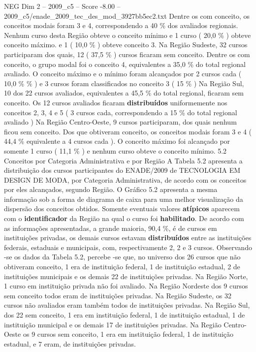 \begin{textsample}{NEG Dim 2 – 2009\_c5 – Score -8.00 – 2009\_c5/enade\_2009\_tec\_des\_mod\_3927bb5ec2.txt}
Dentre os com conceito, os conceitos modais foram 3 e 4, correspondendo a 40 \% dos avaliados regionais.
Nenhum curso desta Região obteve o conceito mínimo e 1 curso ( 20,0 \% ) obteve conceito máximo. e 1 ( 10,0 \% ) obteve conceito 3.
Na Região Sudeste, 32 cursos participaram dos quais, 12 ( 37,5 \% ) cursos ficaram sem conceito.
Dentre os com conceito, o grupo modal foi o conceito 4, equivalentes a 35,0 \% do total regional avaliado.
O conceito máximo e o mínimo foram alcançados por 2 cursos cada ( 10,0 \% \% ) e 3 cursos foram classificados no conceito 3 ( 15 \% ) Na Região Sul, 10 dos 22 cursos avaliados, equivalentes a 45,5 \% do total regional, ficaram sem conceito.
Os 12 cursos avaliados ficaram \textbf{distribuídos} uniformemente nos conceitos 2, 3, 4 e 5 ( 3 cursos cada, correspondendo a 15 \% do total regional avaliado ) Na Região Centro-Oeste, 9 cursos participaram, dos quais nenhum ficou sem conceito.
Dos que obtiveram conceito, os conceitos modais foram 3 e 4 ( 44,4 \% equivalente a 4 cursos cada ).
O conceito máximo foi alcançado por somente 1 curso ( 11,1 \% ) e nenhum curso obteve o conceito mínimo. 5.2 Conceitos por Categoria Administrativa e por Região A Tabela 5.2 apresenta a distribuição dos cursos participantes do ENADE/2009 de TECNOLOGIA EM DESIGN DE MODA, por Categoria Administrativa, de acordo com os conceitos por eles alcançados, segundo Região.
O Gráfico 5.2 apresenta a mesma informação sob a forma de diagrama de caixa para uma melhor visualização da dispersão dos conceitos obtidos.
Somente eventuais valores \textbf{atípicos} aparecem com o \textbf{identificador} da Região na qual o curso foi \textbf{habilitado}.
De acordo com as informações apresentadas, a grande maioria, 90,4 \%, é de cursos em instituições privadas, os demais cursos estavam \textbf{distribuídos} entre as instituições federais, estaduais e municipais, com, respectivamente 2, 2 e 3 cursos.
Observando -se os dados da Tabela 5.2, percebe -se que, no universo dos 26 cursos que não obtiveram conceito, 1 era de instituição federal, 1 de instituição estadual, 2 de instituições municipais e os demais 22 de instituições privadas.
Na Região Norte, 1 curso em instituição privada não foi avaliado.
Na Região Nordeste dos 9 cursos sem conceito todos eram de instituições privadas.
Na Região Sudeste, os 32 cursos não avaliados eram também todos de instituições privadas.
Na Região Sul, dos 22 sem conceito, 1 era em instituição federal, 1 de instituição estadual, 1 de instituição municipal e os demais 17 de instituições privadas.
Na Região Centro-Oeste os 9 cursos sem conceito, 1 era em instituição federal, 1 de instituição estadual, e 7 eram, de instituições privadas.

\end{textsample}
